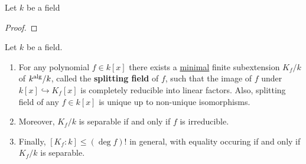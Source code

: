         \begin{lemma} \label{lemma: irreducible_polynomials_have_no_repeated_roots}
            Let $k$ be a field 
        \end{lemma}
            \begin{proof}
                
            \end{proof}
        \begin{proposition} \label{prop: splitting_fields}
            Let $k$ be a field.
            \begin{enumerate}
                \item For any polynomial $f \in k[x]$ there exists a \underline{minimal} finite subextension $K_f/k$ of $k^{\mathrm{alg}}/k$, called the \textbf{splitting field} of $f$, such that the image of $f$ under $k[x] \hookrightarrow K_f[x]$ is completely reducible into linear factors. Also,  splitting field of any $f \in k[x]$ is unique up to non-unique isomorphisms.
                \item Moreover, $K_f/k$ is separable if and only if $f$ is irreducible.
                \item Finally, $[K_f : k] \leq (\deg f)!$ in general, with equality occuring if and only if $K_f/k$ is separable.
            \end{enumerate}
        \end{proposition}
